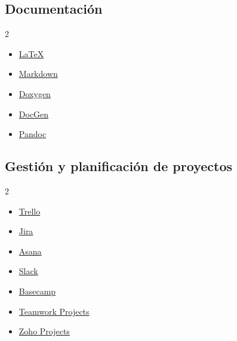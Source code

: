 \newpage
\subsection{Documentación}
\begin{multicols}{2}
\begin{itemize}[nosep]
\item \href{https://www.latex-project.org/}{\LaTeX}
\item \href{https://markdown.es/}{Markdown}
\item \href{http://www.stack.nl/\%7Edimitri/doxygen/index.html}{Doxygen}
\item \href{http://mtmacdonald.github.io/docgen/docs/index.html}{DocGen}
\item \href{http://pandoc.org/}{Pandoc}
\end{itemize}
\end{multicols}


\subsection{Gestión y planificación de proyectos}
\begin{multicols}{2}
\begin{itemize}[nosep]
\item \href{https://trello.com/}{Trello}
\item \href{https://es.atlassian.com/software/jira}{Jira}
\item \href{https://asana.com/}{Asana}
\item \href{https://slack.com/}{Slack}
\item \href{https://basecamp.com/}{Basecamp}
\item \href{https://www.teamwork.com/project-management-software}{Teamwork Projects}
\item \href{https://www.zoho.com/projects/}{Zoho Projects}
\end{itemize}
\end{multicols}


